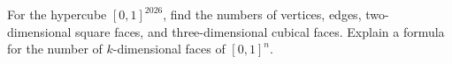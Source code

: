For the hypercube $[0,1]^{2026}$, find the numbers of vertices, edges, two-dimensional square faces, and three-dimensional cubical faces. Explain a formula for the number of $k$-dimensional faces of $[0,1]^n$.
